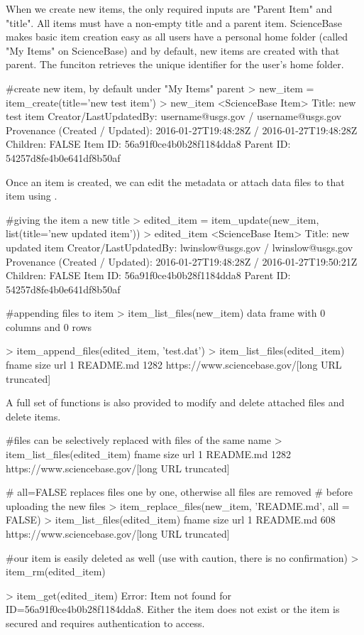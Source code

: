 When we create new items, the only required inputs are "Parent Item" and "title". All 
items must have a non-empty title and a parent item. ScienceBase makes basic item creation
easy as all users have a personal home folder (called "My Items" on ScienceBase) and by default,
new items are created with that parent. The funciton  retrieves the
unique identifier for the user's home folder. 

\begin{example}
#create new item, by default under "My Items" parent
> new_item = item_create(title='new test item')
> new_item
<ScienceBase Item> 
  Title: new test item
  Creator/LastUpdatedBy:     username@usgs.gov / username@usgs.gov
  Provenance (Created / Updated):  2016-01-27T19:48:28Z / 2016-01-27T19:48:28Z
  Children: FALSE
  Item ID: 56a91f0ce4b0b28f1184dda8
  Parent ID: 54257d8fe4b0e641df8b50af
\end{example}

Once an item is created, we can edit the metadata or attach data files to that 
item using . 

\begin{example}
#giving the item a new title
> edited_item = item_update(new_item, list(title='new updated item'))
> edited_item
<ScienceBase Item> 
  Title: new updated item
  Creator/LastUpdatedBy:     lwinslow@usgs.gov / lwinslow@usgs.gov
  Provenance (Created / Updated):  2016-01-27T19:48:28Z / 2016-01-27T19:50:21Z
  Children: FALSE
  Item ID: 56a91f0ce4b0b28f1184dda8
  Parent ID: 54257d8fe4b0e641df8b50af

#appending files to item
> item_list_files(new_item)
data frame with 0 columns and 0 rows

> item_append_files(edited_item, 'test.dat')
> item_list_files(edited_item)
      fname size     url
1 README.md 1282     https://www.sciencebase.gov/[long URL truncated]


\end{example}

A full set of functions is also provided to modify and delete attached 
files and delete items. 

\begin{example}
#files can be selectively replaced with files of the same name
> item_list_files(edited_item)
      fname size     url
1 README.md 1282     https://www.sciencebase.gov/[long URL truncated]

# all=FALSE replaces files one by one, otherwise all files are removed
# before uploading the new files
> item_replace_files(new_item, 'README.md', all = FALSE)
> item_list_files(edited_item)
      fname size     url
1 README.md 608     https://www.sciencebase.gov/[long URL truncated]

#our item is easily deleted as well (use with caution, there is no confirmation)
> item_rm(edited_item)

> item_get(edited_item)
Error: Item not found for ID=56a91f0ce4b0b28f1184dda8. Either the item does 
not exist or the item is secured and requires authentication to access.
\end{example}


